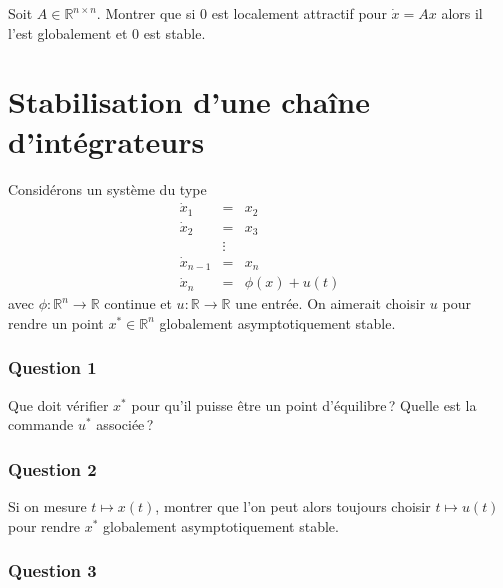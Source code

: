 Soit \(A\in \mathbb{R}^{n\times n}\). Montrer que si 0 est localement
attractif pour $\dot{x} = Ax$ alors il l'est globalement et 0 est stable.

\hypertarget{exo_cont_lin}{%
\section{Stabilisation d'une chaîne
d'intégrateurs}\label{exo_cont_lin}}

Considérons un système du type \[
\begin{array}{rcl}
\dot{x}_1 &=& x_2 \\
\dot{x}_2 &=& x_3 \\
&\vdots&\\
\dot{x}_{n-1} &=& x_n \\
\dot{x}_n &=& \phi(x) + u(t)
\end{array}
\] avec \(\phi:\mathbb{R}^n \to \mathbb{R}\) continue et
\(u:\mathbb{R}\to \mathbb{R}\) une entrée. On aimerait choisir \(u\)
pour rendre un point \(x^*\in \mathbb{R}^n\) globalement
asymptotiquement stable.

\hypertarget{cont-lin-1}{%
\subsubsection*{Question 1}\label{cont-lin-1}}


Que doit vérifier \(x^*\) pour qu'il puisse être un point d'équilibre\,?
Quelle est la commande \(u^*\) associée\,?

\hypertarget{cont-lin-2}{%
\subsubsection*{Question 2}\label{cont-lin-2}}


Si on mesure \(t\mapsto x(t)\), montrer que l'on peut alors toujours
choisir \(t\mapsto u(t)\) pour rendre \(x^*\) globalement
asymptotiquement stable.

\hypertarget{cont-lin-3}{%
\subsubsection*{Question 3}\label{cont-lin-3}}


